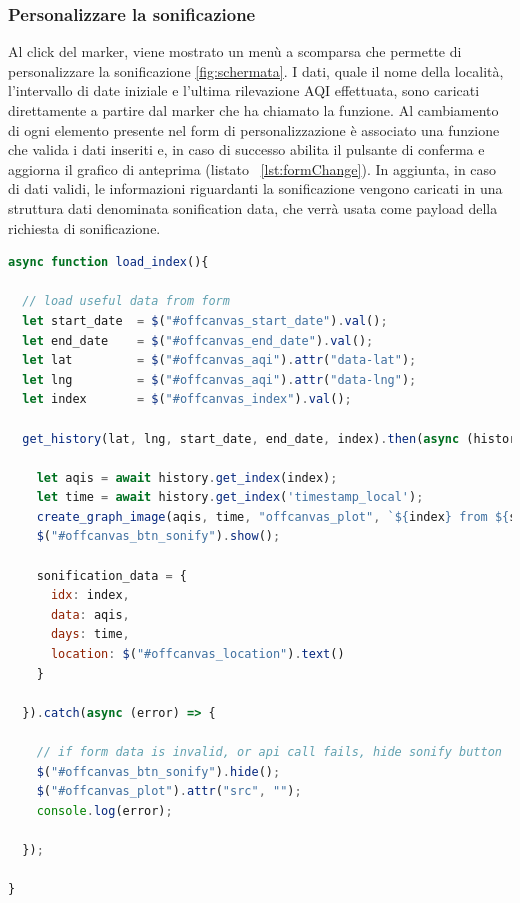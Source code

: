 \subsubsection{Personalizzare la sonificazione}
Al click del marker, viene mostrato un menù a scomparsa che permette di personalizzare la sonificazione \ref{fig:schermata}.
I dati, quale il nome della località, l'intervallo di date iniziale e l'ultima rilevazione AQI effettuata, sono caricati direttamente a partire dal marker che ha chiamato la funzione.
Al cambiamento di ogni elemento presente nel form di personalizzazione è associato una funzione che valida i dati inseriti e, in caso di successo abilita il pulsante di conferma e aggiorna il grafico di anteprima (listato ~\ref{lst:formChange}).
In aggiunta, in caso di dati validi, le informazioni riguardanti la sonificazione vengono caricati in una struttura dati denominata sonification data, che verrà usata come payload della richiesta di sonificazione.

\begin{lstlisting}[language=Javascript,caption={La funzione che gestisce il cambiamento di un elemento del form.},label={lst:formChange}]
async function load_index(){

  // load useful data from form
  let start_date  = $("#offcanvas_start_date").val();
  let end_date    = $("#offcanvas_end_date").val();
  let lat         = $("#offcanvas_aqi").attr("data-lat");
  let lng         = $("#offcanvas_aqi").attr("data-lng");
  let index       = $("#offcanvas_index").val();
  
  get_history(lat, lng, start_date, end_date, index).then(async (history) => {

    let aqis = await history.get_index(index);
    let time = await history.get_index('timestamp_local');
    create_graph_image(aqis, time, "offcanvas_plot", `${index} from ${start_date} to ${end_date}`);
    $("#offcanvas_btn_sonify").show();

    sonification_data = {
      idx: index,
      data: aqis,
      days: time,
      location: $("#offcanvas_location").text()
    }

  }).catch(async (error) => {
      
    // if form data is invalid, or api call fails, hide sonify button
    $("#offcanvas_btn_sonify").hide();
    $("#offcanvas_plot").attr("src", "");
    console.log(error);

  });

}
\end{lstlisting}

